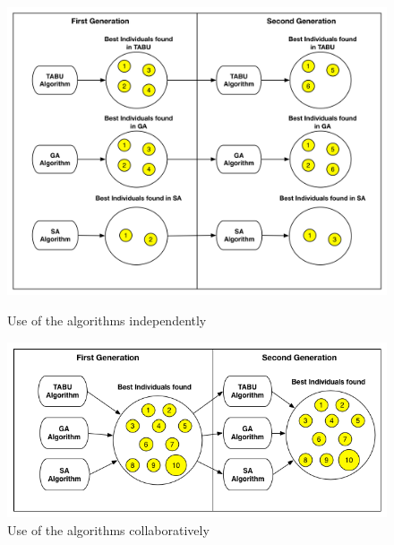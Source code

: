 \documentclass{bmcart}
\begin{document}
\begin{backmatter}
\begin{figure}[h]
\begin{minipage}{.5\textwidth}
\centering
\includegraphics{./images/independ.png}
\caption{Use of the algorithms independently \citep{Gois2016}}
\label{fig:firstaproach}
\end{minipage}
\begin{minipage}{.5\textwidth}
\centering
\includegraphics{./images/collaborative.png}
\caption{Use of the  algorithms collaboratively \citep{Gois2016}}
\label{fig:secondapproach}
\end{minipage}
\end{figure}



\end{backmatter}
\end{document}
